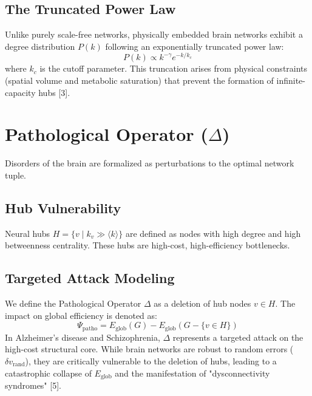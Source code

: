 \documentclass[11pt,fleqn]{article}
\begin{document}
\subsection{The Truncated Power Law}
Unlike purely scale-free networks, physically embedded brain networks exhibit a degree distribution $P(k)$ following an exponentially truncated power law:
\begin{equation}
    P(k) \propto k^{-\gamma} e^{-k/k_c}
\end{equation}
where $k_c$ is the cutoff parameter. This truncation arises from physical constraints (spatial volume and metabolic saturation) that prevent the formation of infinite-capacity hubs [3].

\section{Pathological Operator ($\Delta$)}
Disorders of the brain are formalized as perturbations to the optimal network tuple.

\subsection{Hub Vulnerability}
Neural hubs $H = \{v \mid k_v \gg \langle k \rangle\}$ are defined as nodes with high degree and high betweenness centrality. These hubs are high-cost, high-efficiency bottlenecks.

\subsection{Targeted Attack Modeling}
We define the Pathological Operator $\Delta$ as a deletion of hub nodes $v \in H$. The impact on global efficiency is denoted as:
\begin{equation}
    \Psi_{\text{patho}} = E_{\text{glob}}(G) - E_{\text{glob}}(G - \{v \in H\})
\end{equation}
In Alzheimer's disease and Schizophrenia, $\Delta$ represents a targeted attack on the high-cost structural core. While brain networks are robust to random errors ($\delta v_{\text{rand}}$), they are critically vulnerable to the deletion of hubs, leading to a catastrophic collapse of $E_{\text{glob}}$ and the manifestation of "dysconnectivity syndromes" [5].
\end{document}
